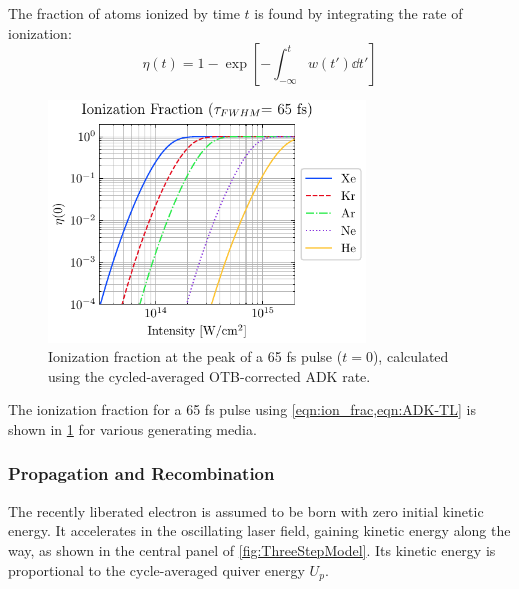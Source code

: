 The fraction of atoms ionized by time $t$ is found by integrating the rate of ionization:
\begin{equation}
\eta(t) = 1 - \exp \left[ - \int_{-\infty}^{t} w(t') \dd{t'} \right]
\label{eqn:ion_frac}
\end{equation}

\begin{figure}
	\centering
	\includegraphics[width=0.75\textwidth]{figures/chap1/ADK_ion_frac_TL.pdf}
	\caption{Ionization fraction at the peak of a 65 fs pulse ($t=0$), calculated using the cycled-averaged OTB-corrected ADK rate.}
	\label{fig:ADK_ion_frac}
\end{figure}

The ionization fraction for a 65 fs pulse using \cref{eqn:ion_frac,eqn:ADK-TL} is shown in \cref{fig:ADK_ion_frac} for various generating media.

\subsubsection{Propagation and Recombination}
\label{sec:HHG_propagation_recombination}

The recently liberated electron is assumed to be born with zero initial kinetic energy. It accelerates in the oscillating laser field, gaining kinetic energy along the way, as shown in the central panel of \cref{fig:ThreeStepModel}. Its kinetic energy is proportional to the cycle-averaged quiver energy $U_p$.

